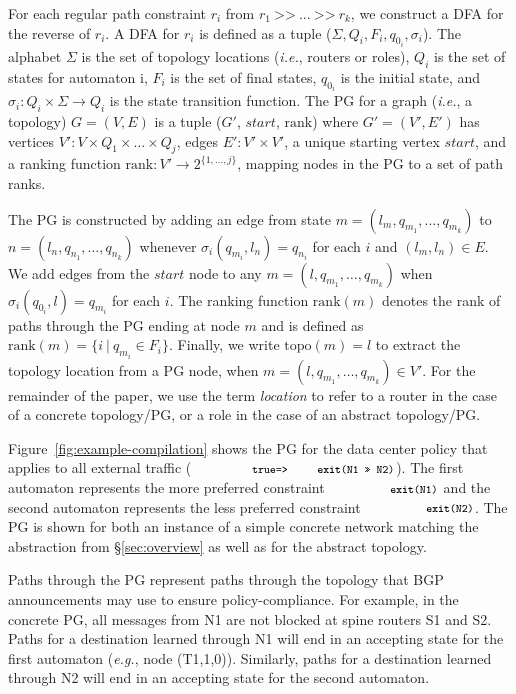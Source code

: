 \documentclass[numbers, 10pt]{sigplanconf}
\newcommand{\EG}{\emph{e.g.}}
\newcommand{\IE}{\emph{i.e.}}
\newcommand{\set}[1]{\ensuremath{\{ #1 \} }}
\newcommand{\CD}[1]{\texttt{\small #1}}
\newcommand{\KW}[1]{\texttt{\small\bfseries{#1}}}
\newcommand{\True}{\CD{true}}
\newcommand{\Prefer}{\texttt{>>}}
\newcommand{\Path}{\texttt{=>}}
\newcommand{\Exit}{\KW{exit}}
\newcommand{\Topo}[1]{\ensuremath{{\mathrm{topo}}(#1)}}
\newcommand{\Pref}{\ensuremath{\mathrm{rank}}}
\begin{document}
For each regular path constraint $r_i$ from $r_1 ~\Prefer~ ... ~\Prefer~ r_k$, we construct a DFA for the reverse of $r_i$. A DFA for $r_i$ is defined as a tuple ($\Sigma, Q_i, F_i, q_{0_i}, \sigma_i$). The alphabet $\Sigma$ is the set of topology locations (\IE, routers or roles), $Q_i$ is the set of states for automaton i, $F_i$ is the set of final states, $q_{0_i}$ is the initial state, and $\sigma_i \colon Q_i \times \Sigma \rightarrow Q_i$ is the state transition function.
%
The PG for a graph (\IE, a topology) $G=(V,E)$ is a tuple ($G'$, $start$, \Pref) where $G' = (V',E')$ has
vertices $V' \colon V \times Q_1 \times \dots \times Q_j$,
edges $E' \colon V' \times V'$,
a unique starting vertex $start$,
and a ranking function $\Pref \colon V' \rightarrow 2^{\set{1, \dots, j}}$, mapping nodes in the PG to a set of path ranks.

The PG is constructed by adding an edge from state $m = (l_m, q_{m_1}, \dots, q_{m_k})$ to $n = (l_n, q_{n_1}, \dots, q_{n_k})$ whenever $\sigma_i(q_{m_i}, l_n) = q_{n_i}$ for each $i$ and $(l_m,l_n) \in E$.
%
We add edges from the $\mathit{start}$ node to any $m = (l, q_{m_1}, \dots, q_{m_k})$ when $\sigma_i(q_{0_i}, l) = q_{m_i}$ for each $i$.
%
The ranking function $\Pref(m)$ denotes the rank of paths through the PG ending at node $m$ and is defined as $\Pref(m) = \set{i~\vert~q_{m_i} \in F_i}$.
%
Finally, we write $\Topo{m} = l$ to extract the topology location from a PG node, when $m = (l, q_{m_1}, \dots, q_{m_k}) \in V'$. For the remainder of the paper, we use the term \emph{location} to refer to a router in the case of a concrete topology/PG, or a role in the case of an abstract topology/PG.

Figure~\ref{fig:example-compilation} shows the PG for the data center policy that applies to all external traffic ($\CD{\True \Path \Exit(N1~\Prefer~N2)}$).
%
%
The first automaton represents the more preferred constraint $\CD{\Exit(N1)}$ and the second automaton represents the less preferred constraint $\CD{\Exit(N2)}$. The PG is shown for both an instance of a simple concrete network matching the abstraction from \S\ref{sec:overview} as well as for the abstract topology.

Paths through the PG represent paths through the topology that BGP announcements may use to ensure policy-compliance. For example, in the concrete PG, all messages from N1 are not blocked at spine routers S1 and S2. Paths for a destination learned through N1 will end in an accepting state for the first automaton (\EG, node (T1,1,0)). Similarly, paths for a destination learned through N2 will end in an accepting state for the second automaton.
\end{document}
